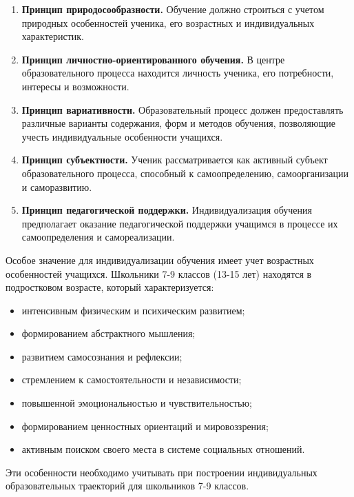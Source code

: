 \documentclass[a4paper,14pt]{extreport}
\begin{document}
\begin{enumerate}
    \item \textbf{Принцип природосообразности.} Обучение должно строиться с учетом природных особенностей ученика, его возрастных и индивидуальных характеристик.
    
    \item \textbf{Принцип личностно-ориентированного обучения.} В центре образовательного процесса находится личность ученика, его потребности, интересы и возможности.
    
    \item \textbf{Принцип вариативности.} Образовательный процесс должен предоставлять различные варианты содержания, форм и методов обучения, позволяющие учесть индивидуальные особенности учащихся.
    
    \item \textbf{Принцип субъектности.} Ученик рассматривается как активный субъект образовательного процесса, способный к самоопределению, самоорганизации и саморазвитию.
    
    \item \textbf{Принцип педагогической поддержки.} Индивидуализация обучения предполагает оказание педагогической поддержки учащимся в процессе их самоопределения и самореализации.
\end{enumerate}

Особое значение для индивидуализации обучения имеет учет возрастных особенностей учащихся. Школьники 7-9 классов (13-15 лет) находятся в подростковом возрасте, который характеризуется:

\begin{itemize}
    \item интенсивным физическим и психическим развитием;
    \item формированием абстрактного мышления;
    \item развитием самосознания и рефлексии;
    \item стремлением к самостоятельности и независимости;
    \item повышенной эмоциональностью и чувствительностью;
    \item формированием ценностных ориентаций и мировоззрения;
    \item активным поиском своего места в системе социальных отношений.
\end{itemize}

Эти особенности необходимо учитывать при построении индивидуальных образовательных траекторий для школьников 7-9 классов.
\end{document}
